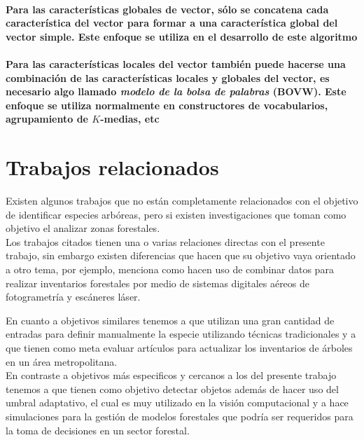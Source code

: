\documentclass[review]{elsarticle}
\begin{document}
\paragraph{Para las características globales de vector, sólo se concatena cada característica del vector para formar a una característica global del vector simple. Este enfoque se utiliza en el desarrollo de este algoritmo} 

\paragraph{Para las características locales del vector también puede hacerse una combinación de las características locales y globales del vector, es necesario algo llamado \emph{modelo de la bolsa de palabras} (BOVW). Este enfoque se utiliza normalmente en constructores de vocabularios, agrupamiento de $K$-medias, etc} 

\section{Trabajos relacionados}
Existen algunos trabajos que no están completamente relacionados con el objetivo de identificar especies arbóreas, pero si existen investigaciones que toman como objetivo el analizar zonas forestales.\\

Los trabajos citados tienen una o varias relaciones directas con el presente trabajo, sin embargo existen diferencias que hacen que su objetivo vaya orientado a otro tema, por ejemplo, \citet{rf14} menciona como hacen uso de combinar datos para realizar inventarios forestales por medio de sistemas digitales aéreos de fotogrametría y escáneres láser. 

En cuanto a objetivos similares tenemos a \citet{rf1} que utilizan una gran cantidad de entradas para definir manualmente la especie utilizando técnicas tradicionales y a \citet{rf2} que tienen como meta evaluar artículos para actualizar los inventarios de árboles en un área metropolitana.\\ 

En contraste a objetivos más especificos y cercanos a los del presente trabajo tenemos a \citet{rf3} que tienen como objetivo detectar objetos además de hacer uso del umbral adaptativo, el cual es muy utilizado en la visión computacional y a \citet{rf9} hace simulaciones para la gestión de modelos forestales que podría ser requeridos para la toma de decisiones en un sector forestal.\\
\end{document}
